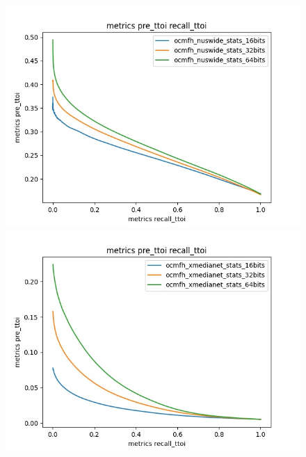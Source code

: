 \begin{figure}[H]
\begin{minipage}[!h]{0.6\linewidth}
            \end{minipage}
            \begin{minipage}[!h]{0.6\linewidth}
                \centering
                \includegraphics[width=\linewidth]{resultsImages/precisionVsRecall/metrics pre_ttoi recall_ttoi_ocmfh_nuswide.jpeg}
            \end{minipage}
            \begin{minipage}[!h]{0.6\linewidth}
                \centering
                \includegraphics[width=\linewidth]{resultsImages/precisionVsRecall/metrics pre_ttoi recall_ttoi_ocmfh_xmedia.jpeg}

\end{minipage}
\end{figure}
